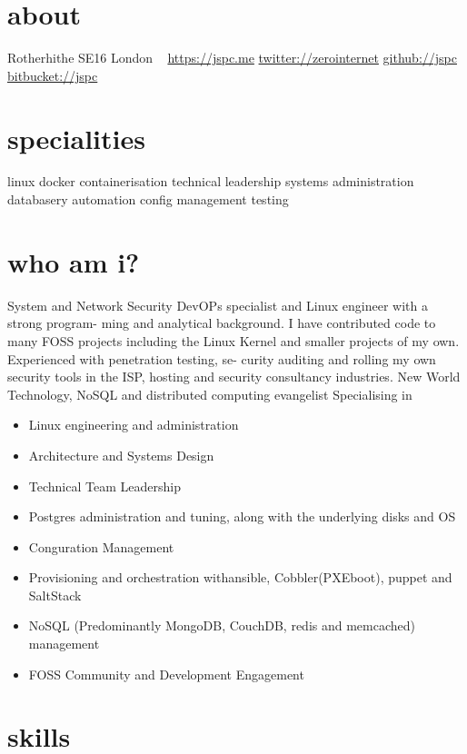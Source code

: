 \documentclass[]{friggeri-cv}
\begin{document}


\begin{aside}
\section{about}
Rotherhithe
SE16 London
~
\href{https://jspc.me}{https://jspc.me}
\href{https://twitter.com/zerointernet}{twitter://zerointernet}
\href{https://github.com/jspc}{github://jspc}
\href{https://bitbucket.org/jspc/}{bitbucket://jspc}
\section{specialities}
linux
docker
containerisation
technical leadership
systems administration
databasery
automation
config management
testing
\end{aside}

\section{who am i?}


System and Network Security DevOPs specialist and Linux engineer with a strong program- ming and analytical background. I have contributed code to many FOSS projects including the Linux Kernel and smaller projects of my own. Experienced with penetration testing, se- curity auditing and rolling my own security tools in the ISP, hosting and security consultancy industries. New World Technology, NoSQL and distributed computing evangelist
Specialising in

\begin{itemize}
\item Linux engineering and administration
\item Architecture and Systems Design
\item Technical Team Leadership
\item Postgres administration and tuning, along with the underlying disks and OS
\item Conguration Management
\item Provisioning and orchestration withansible, Cobbler(PXEboot), puppet and SaltStack
\item NoSQL (Predominantly MongoDB, CouchDB, redis and memcached) management
\item FOSS Community and Development Engagement
\end{itemize}

\section{skills}
\end{document}
